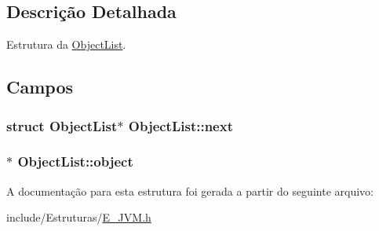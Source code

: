 \subsection{Descrição Detalhada}
Estrutura da \hyperlink{struct_object_list}{Object\+List}. 

\subsection{Campos}
\hypertarget{struct_object_list_a2e433d18d52a5cd2b3f90651157fdb23}{}
\subsubsection[{next}]{\setlength{\rightskip}{0pt plus 5cm}struct {\bf Object\+List}$\ast$ Object\+List\+::next}\label{struct_object_list_a2e433d18d52a5cd2b3f90651157fdb23}
\hypertarget{struct_object_list_aae49442726f57917e2d6611c62f1e071}{}
\subsubsection[{object}]{$\ast$ Object\+List\+::object}\label{struct_object_list_aae49442726f57917e2d6611c62f1e071}


A documentação para esta estrutura foi gerada a partir do seguinte arquivo\+:\begin{DoxyCompactItemize}
\item 
include/\+Estruturas/\hyperlink{_e___j_v_m_8h}{E\+\_\+\+J\+V\+M.\+h}\end{DoxyCompactItemize}
